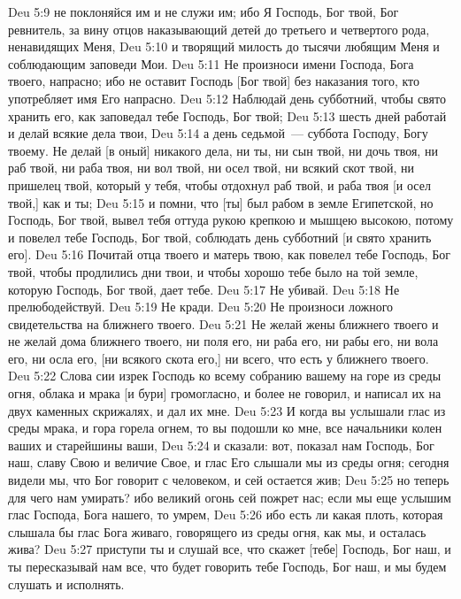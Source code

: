 \vs Deu 5:9 не поклоняйся им и не служи им; ибо Я Господь, Бог твой, Бог ревнитель, за вину отцов наказывающий детей до третьего и четвертого рода, ненавидящих Меня,
\vs Deu 5:10 и творящий милость до тысячи  любящим Меня и соблюдающим заповеди Мои.
\rsbpar\vs Deu 5:11 Не произноси имени Господа, Бога твоего, напрасно; ибо не оставит Господь [Бог твой] без наказания того, кто употребляет имя Его напрасно.
\rsbpar\vs Deu 5:12 Наблюдай день субботний, чтобы свято хранить его, как заповедал тебе Господь, Бог твой;
\vs Deu 5:13 шесть дней работай и делай всякие дела твои,
\vs Deu 5:14 а день седьмой~--- суббота Господу, Богу твоему. Не делай [в оный] никакого дела, ни ты, ни сын твой, ни дочь твоя, ни раб твой, ни раба твоя, ни вол твой, ни осел твой, ни всякий скот твой, ни пришелец твой, который у тебя, чтобы отдохнул раб твой, и раба твоя [и осел твой,] как и ты;
\vs Deu 5:15 и помни, что [ты] был рабом в земле Египетской, но Господь, Бог твой, вывел тебя оттуда рукою крепкою и мышцею высокою, потому и повелел тебе Господь, Бог твой, соблюдать день субботний [и свято хранить его].
\rsbpar\vs Deu 5:16 Почитай отца твоего и матерь твою, как повелел тебе Господь, Бог твой, чтобы продлились дни твои, и чтобы хорошо тебе было на той земле, которую Господь, Бог твой, дает тебе.
\rsbpar\vs Deu 5:17 Не убивай.
\rsbpar\vs Deu 5:18 Не прелюбодействуй.
\rsbpar\vs Deu 5:19 Не кради.
\rsbpar\vs Deu 5:20 Не произноси ложного свидетельства на ближнего твоего.
\rsbpar\vs Deu 5:21 Не желай жены ближнего твоего и не желай дома ближнего твоего, ни поля его, ни раба его, ни рабы его, ни вола его, ни осла его, [ни всякого скота его,] ни всего, что есть у ближнего твоего.
\rsbpar\vs Deu 5:22 Слова сии изрек Господь ко всему собранию вашему на горе из среды огня, облака и мрака [и бури] громогласно, и более не говорил, и написал их на двух каменных скрижалях, и дал их мне.
\vs Deu 5:23 И когда вы услышали глас из среды мрака, и гора горела огнем, то вы подошли ко мне, все начальники колен ваших и старейшины ваши,
\vs Deu 5:24 и сказали: вот, показал нам Господь, Бог наш, славу Свою и величие Свое, и глас Его слышали мы из среды огня; сегодня видели мы, что Бог говорит с человеком, и сей остается жив;
\vs Deu 5:25 но теперь для чего нам умирать? ибо великий огонь сей пожрет нас; если мы еще услышим глас Господа, Бога нашего, то умрем,
\vs Deu 5:26 ибо есть ли какая плоть, которая слышала бы глас Бога живаго, говорящего из среды огня, как мы, и осталась жива?
\vs Deu 5:27 приступи ты и слушай все, что скажет [тебе] Господь, Бог наш, и ты пересказывай нам все, что будет говорить тебе Господь, Бог наш, и мы будем слушать и исполнять.
